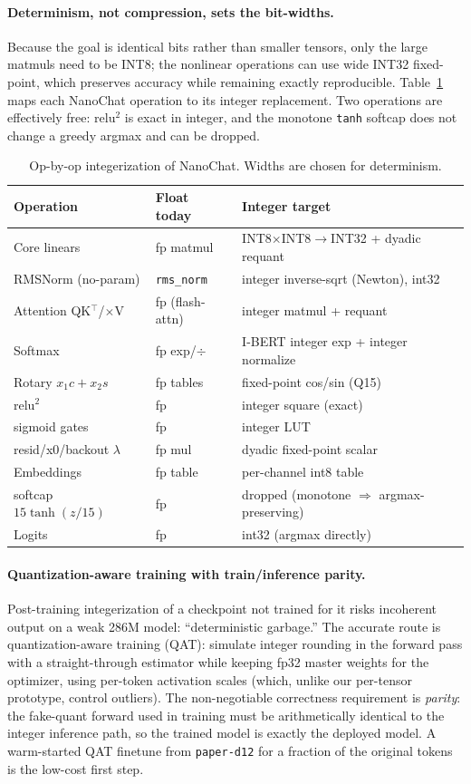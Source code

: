 \documentclass[wcp]{jmlr}
\begin{document}
\paragraph{Determinism, not compression, sets the bit-widths.} Because the goal is
identical bits rather than smaller tensors, only the large matmuls need to be INT8;
the nonlinear operations can use wide INT32 fixed-point, which preserves accuracy
while remaining exactly reproducible. Table~\ref{tab:intspec} maps each NanoChat
operation to its integer replacement. Two operations are effectively free: relu$^2$
is exact in integer, and the monotone \texttt{tanh} softcap does not change a greedy
argmax and can be dropped.

\begin{table}[t]
\centering
\caption{Op-by-op integerization of NanoChat. Widths are chosen for determinism.}
\label{tab:intspec}
\footnotesize
\begin{tabular}{lll}
\toprule
Operation & Float today & Integer target \\
\midrule
Core linears & fp matmul & INT8$\times$INT8$\to$INT32 + dyadic requant \\
RMSNorm (no-param) & \texttt{rms\_norm} & integer inverse-sqrt (Newton), int32 \\
Attention QK$^\top$/$\times$V & fp (flash-attn) & integer matmul + requant \\
Softmax & fp exp/$\div$ & I-BERT integer exp + integer normalize \\
Rotary $x_1c{+}x_2s$ & fp tables & fixed-point cos/sin (Q15) \\
relu$^2$ & fp & integer square (exact) \\
sigmoid gates & fp & integer LUT \\
resid/x0/backout $\lambda$ & fp mul & dyadic fixed-point scalar \\
Embeddings & fp table & per-channel int8 table \\
softcap $15\tanh(z/15)$ & fp & dropped (monotone $\Rightarrow$ argmax-preserving) \\
Logits & fp & int32 (argmax directly) \\
\bottomrule
\end{tabular}
\end{table}

\paragraph{Quantization-aware training with train/inference parity.} Post-training
integerization of a checkpoint not trained for it risks incoherent output on a weak
286M model: ``deterministic garbage.'' The accurate route is quantization-aware
training (QAT): simulate integer rounding in the forward pass with a straight-through
estimator while keeping fp32 master weights for the optimizer, using per-token
activation scales (which, unlike our per-tensor prototype, control outliers). The
non-negotiable correctness requirement is \emph{parity}: the fake-quant forward used
in training must be arithmetically identical to the integer inference path, so the
trained model is exactly the deployed model. A warm-started QAT finetune from
\texttt{paper-d12} for a fraction of the original tokens is the low-cost first step.
\end{document}
